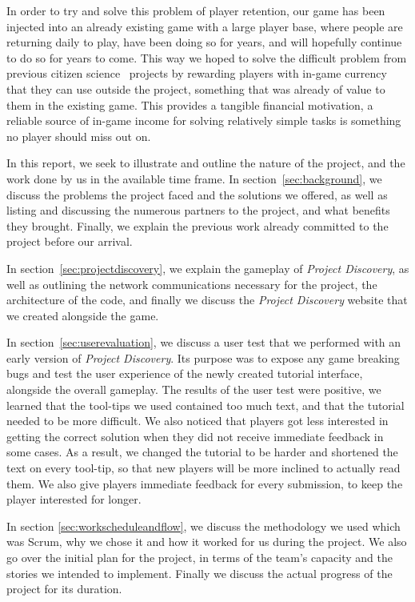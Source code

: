 In order to try and solve this problem of player retention, our game has been injected into an already existing game with a large player base, where people are returning daily to play, have been doing so for years, and will hopefully continue to do so for years to come. This way we hoped to solve the difficult problem from previous citizen science~\cite{citizenscience} projects by rewarding players with in-game currency that they can use outside the project, something that was already of value to them in the existing game. This provides a tangible financial motivation, a reliable source of in-game income for solving relatively simple tasks is something no player should miss out on.

In this report, we seek to illustrate and outline the nature of the project, and the work done by us in the available time frame. In section~\ref{sec:background}, we discuss the problems the project faced and the solutions we offered, as well as listing and discussing the numerous partners to the project, and what benefits they brought. Finally, we explain the previous work already committed to the project before our arrival.

In section~\ref{sec:projectdiscovery}, we explain the gameplay of \emph{Project Discovery}, as well as outlining the network communications necessary for the project, the architecture of the code, and finally we discuss the \emph{Project Discovery} website that we created alongside the game. 

In section~\ref{sec:userevaluation}, we discuss a user test that we performed with an early version of \emph{Project Discovery}. Its purpose was to expose any game breaking bugs and test the user experience of the newly created tutorial interface, alongside the overall gameplay. The results of the user test were positive, we learned that the tool-tips we used contained too much text, and that the tutorial needed to be more difficult. We also noticed that players got less interested in getting the correct solution when they did not receive immediate feedback in some cases. As a result, we changed the tutorial to be harder and shortened the text on every tool-tip, so that new players will be more inclined to actually read them. We also give players immediate feedback for every submission, to keep the player interested for longer.

In section \ref{sec:workscheduleandflow}, we discuss the methodology we used which was Scrum, why we chose it and how it worked for us during the project. We also go over the initial plan for the project, in terms of the team's capacity and the stories we intended to implement. Finally we discuss the actual progress of the project for its duration.

